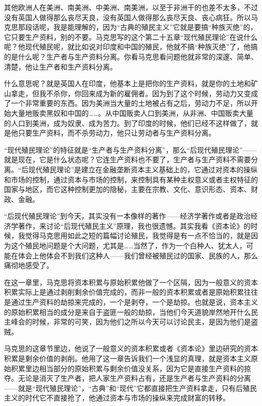 \documentclass[UTF8, 12pt, a4paper]{ctexrep}
\begin{document}
其他欧洲人在美洲、南美洲、中美洲、南美洲，以至于非洲干的也差不太多，不过没有英国人做得那么丧尽天良，没有英国人做得那么丧尽天良、丧心病狂。所以马克思那段话呢，我是能理解的，因为“古典的殖民主义”它就是要搞“种族灭绝”的，它只要生产资料，别的不要。马克思写的这个第二十五章“现代殖民理论”在说什么呢？他现代殖民呢，就比如说对印度和中国的殖民，他就不搞“种族灭绝”了，他搞的是什么呢？生产者与生产资料分离。你看马克思看问题他就非常的深邃、简单、清楚，他让生产者和生产资料分离。

什么意思呢？就是英国人在印度，他基本上是把你的生产资料，就是你的土地和矿山拿走，但我不杀你，你回来成为新的雇佣者。因为到了这个时候，劳动力又变成了一个非常重要的东西。因为美洲当大量的土地被占有之后，劳动力不足，所以开始大量地贩卖黑奴和中国的……。从中国贩卖人口到美洲，从非洲、中国贩卖大量的人口到美洲，成为奴隶、成为苦力。到了印度的时候，他们已经不这样做了，就是他只要生产资料，而不杀劳动力，他只让劳动者与生产资料分离。

“现代殖民理论”的特征就是“生产者与生产资料分离”，那么“后现代殖民理论”——就是现在，它是什么状态呢？它连生产资料也不要了，生产者与生产资料不需要分离。“后现代殖民理论”是建立在金融垄断资本主义基础上的，它通过对资本的操纵和市场的控制，通过资本与市场的控制，来控制具有某种主权意义或者主权特征的国家与地区，而它这种控制更加的隐秘，主要在宗教、文化、意识形态、资本、财政、金融。

“后现代殖民理论”到今天，其实没有一本像样的著作——经济学著作或者是政治经济学著作，来讨论“后现代殖民主义”原理，我也很遗憾。其实我看《资本论》的时候，我觉得马克思用如此之短的篇幅讨论殖民，我觉得是有一点不恰当的，就是因为这个殖民地问题是个大问题，尤其是……当然了，作为一个白种人、犹太人，可能在体会上他体会不到我们这种人——我们曾经被殖民过的国家、民族的人，那么痛彻地感受了。

在这一章里，马克思将资本积累与原始积累他做了一个区隔，因为一般意义的资本积累实际上是通过剥削剩余价值完成的，而非一般的资本积累或者是原始积累往往是通过生产资料的劫掠来完成的，一个是剥夺，一个是劫掠。也就是说，资本主义的原始积累相当的成分是来自于盗匪一般的劫掠，当他们今天道貌岸然地开什么民主峰会的时候，非常的可笑，因为他们之所以今天可以讨论民主，是因为他们是盗贼。

马克思的这章节里边，他说了一般意义的资本积累或者《资本论》里边研究的资本积累是剩余价值的剥削。他用了这一章告诉我们一个浅显的真理，就是资本主义原始积累里边相当部分的原始积累与剩余价值没关系，因为它是直接生产资料的掠夺。无论是消灭了生产者，把人家生产资料占有，还是生产者与生产资料的分离——就是“现代殖民理论”，“古典”和“现代”它都直接把生产资料拿走，只有后殖民主义的时代它不直接抢了，他通过资本与市场的操纵来完成财富的转移。
\end{document}
